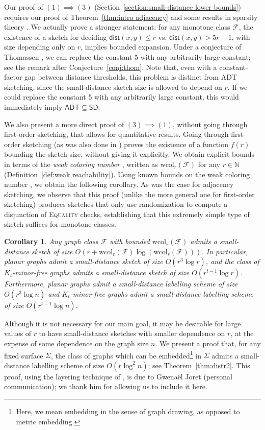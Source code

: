 \documentclass[11pt]{article}
\newtheorem{corollary}[thm]{Corollary}
\theoremstyle{definition}
\newcommand{\wcol}{\mathrm{wcol}}
\renewcommand{\leq}{\leqslant}
\def\F {{\mathcal F}}
\def\bN{{\mathbb N}}
\newcommand{\dist}{\mathsf{dist}}
\begin{document}
Our proof of $(1) \implies (3)$ (Section~\ref{section:small-distance lower bounds}) requires our
proof of Theorem~\ref{thm:intro adjacency} and some results in sparsity theory \cite{KO04,NO12}.  We
actually prove a stronger statement: for any monotone class $\F$, the existence of a sketch for
deciding $\dist(x,y) \leq r$ vs. $\dist(x,y) > 5r-1$, with size depending only on $r$, implies
bounded expansion. Under a conjecture of Thomassen \cite{Tho83}, we can replace the constant 5 with
any arbitrarily large constant; see the remark after Conjecture~\ref{conj:thom}.  Note that, even
with a constant-factor gap between distance thresholds, this problem is distinct from ADT sketching,
since the small-distance sketch size is allowed to depend on $r$. If we could replace the constant 5
with any arbitrarily large constant, this would immediately imply $\mathsf{ADT} \subseteq
\mathsf{SD}$.

We also present a more direct proof of $(3) \implies (1)$, without going through first-order
sketching, that allows for quantitative results.  Going through first-order sketching (as was also
done in \cite{HWZ21}) proves the existence of a function $f(r)$ bounding the sketch size, without
giving it explicitly. We obtain explicit bounds in terms of the \emph{weak coloring number}
\cite{NO12}, written as $\wcol_r(\F)$ for any $r \in \bN$ (Definition~\ref{def:weak reachability}).
Using known bounds on the weak coloring number \cite{HOQRS17}, we obtain the following corollary. As
was the case for adjacency sketching, we observe that this proof (unlike the more general one for
first-order sketching) produces sketches that only use randomization to compute a disjunction of
\textsc{Equality} checks, establishing that this extremely simple type of sketch suffices for
monotone classes.

\begin{corollary}
Any graph class $\F$ with bounded $\wcol_r(\F)$ admits a small-distance sketch of size
$O(r+\wcol_r(\F)\log(\wcol_r(\F)))$. In particular, planar graphs admit a small-distance sketch of
size $O(r^3 \log r)$, and the class of $K_t$-minor-free graphs admits a small-distance sketch of
size $O(r^{t-1} \log r)$. Furthermore, planar graphs admit a small-distance labelling scheme of size
$O(r^3 \log n)$ and $K_t$-minor-free graphs admit a small-distance labelling scheme of size
$O(r^{t-1} \log n)$.
\end{corollary}

\noindent
Although it is not necessary for our main goal, it may be desirable for large values of $r$ to have
small-distance sketches with smaller dependence on $r$, at the expense of some dependence on the
graph size $n$. We present a proof that, for any fixed surface $\Sigma$, the class of graphs which
can be embedded\footnote{Here, we mean embedding in the sense of graph drawing, as opposed to metric
embedding.} in $\Sigma$ admits a small-distance labelling scheme of size $O(r \log^2 n)$; see
Theorem~\ref{thm:distr2}. This proof, using the layering technique of \cite{RS84,Epp00}, is due to
Gwena\"el Joret (personal communication); we thank him for allowing us to include it here.
\end{document}
